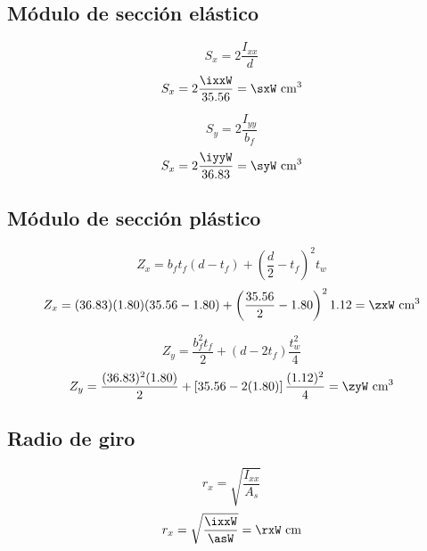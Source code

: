 \documentclass[11pt,a4paper]{article}
\begin{document}
\subsection{Módulo de sección elástico}

\begin{equation}
	S_{x}=2\frac{I_{xx}}{d}
\end{equation}
\begin{align*}
	S_{x}=2\frac{\ixxW}{\dW}=\sxW \text{ cm$^3$}
\end{align*}

\begin{equation}
	S_{y}=2\frac{I_{yy}}{b_f}
\end{equation}
\begin{align*}
	S_{x}=2\frac{\iyyW}{\bfW}=\syW \text{ cm$^3$}
\end{align*}

\subsection{Módulo de sección plástico}
\begin{equation}
	Z_{x}=b_f t_f(d-t_f)+\left(\frac{d}{2}-t_f\right)^2t_w
\end{equation}
\begin{align*}
	Z_{x}=(\bfW)(\tfW)(\dW-\tfW)+\left(\frac{\dW}{2}-\tfW\right)^2\twW=\zxW \text{ cm$^3$}
\end{align*}

\begin{equation}
	Z_{y}=\frac{b_f^2 t_f}{2}+(d-2t_f)\frac{t_w^2}{4} 
\end{equation}
\begin{align*}
	Z_{y}=\frac{(\bfW)^2 (\tfW)}{2}+\left[\dW-2(\tfW)\right]\frac{(\twW)^2}{4}=\zyW \text{ cm$^3$}
\end{align*}

\subsection{Radio de giro}
\begin{equation}
	r_{x}=\sqrt{\frac{I_{xx}}{A_s}} 
\end{equation}
\begin{align*}
	r_{x}=\sqrt{\frac{\ixxW}{\asW}}=\rxW \text{ cm}
\end{align*}
\end{document}
